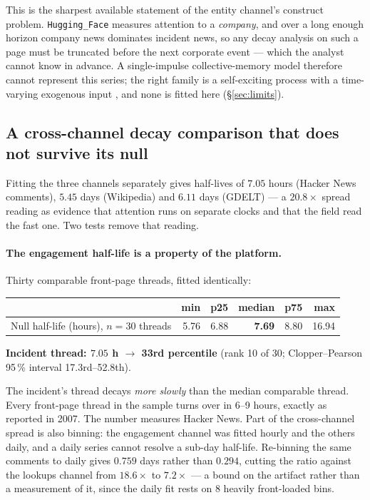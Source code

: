 \documentclass[11pt,a4paper]{article}
\begin{document}
This is the sharpest available statement of the entity channel's construct
problem. \texttt{Hugging\_Face} measures attention to a \emph{company}, and over a
long enough horizon company news dominates incident news, so any decay analysis
on such a page must be truncated before the next corporate event --- which the
analyst cannot know in advance. A single-impulse collective-memory model
therefore cannot represent this series; the right family is a self-exciting
process with a time-varying exogenous input
\cite{crane2008robust,rizoiu2016hip}, and none is fitted here
(§\ref{sec:limits}).

\subsection{A cross-channel decay comparison that does not survive its null}
\label{sec:failed}

Fitting the three channels separately gives half-lives of $7.05$ hours (Hacker
News comments), $5.45$ days (Wikipedia) and $6.11$ days (GDELT) --- a
$20.8\times$ spread reading as evidence that attention runs on separate clocks
and that the field read the fast one. Two tests remove that reading.

\paragraph{The engagement half-life is a property of the platform.} Thirty
comparable front-page threads, fitted identically:

\begin{center}
\small
\begin{tabular}{lrrrrr}
\toprule
& min & p25 & \textbf{median} & p75 & max \\\midrule
Null half-life (hours), $n=30$ threads & 5.76 & 6.88 & \textbf{7.69} & 8.80 & 16.94 \\
\bottomrule
\end{tabular}

\smallskip
\textbf{Incident thread: $7.05$ h $\rightarrow$ 33rd percentile}
(rank 10 of 30; Clopper--Pearson 95\,\% interval 17.3rd--52.8th).
\end{center}

The incident's thread decays \emph{more slowly} than the median comparable
thread. Every front-page thread in the sample turns over in 6--9 hours, exactly
as \cite{wu2007novelty} reported in 2007. The number measures Hacker News. Part
of the cross-channel spread is also binning: the engagement channel was fitted
hourly and the others daily, and a daily series cannot resolve a sub-day
half-life. Re-binning the same comments to daily gives $0.759$ days rather than
$0.294$, cutting the ratio against the lookups channel from $18.6\times$ to
$7.2\times$ --- a bound on the artifact rather than a measurement of it, since
the daily fit rests on 8 heavily front-loaded bins.
\end{document}
